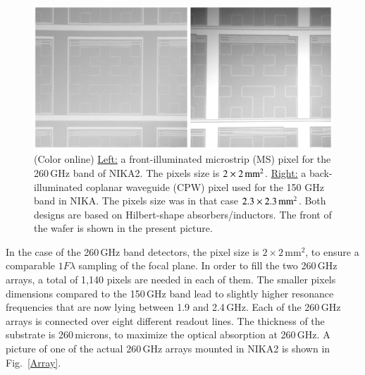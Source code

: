 \documentclass[]{aa} %
\begin{document}
\begin{figure}[h]
   \centering
  	\includegraphics[width=.95\linewidth]{fig3_AB.png}
     \caption{(Color online) \underline{Left:} a front-illuminated microstrip (MS) pixel for the 260\,GHz band of NIKA2. The pixels size is $2\times2\textrm{\,mm}^2$. \underline{Right:} a back-illuminated coplanar waveguide (CPW) pixel used for the 150 GHz band in NIKA. The pixels size was in that case $2.3\times2.3\textrm{\,mm}^2$. Both designs are based on Hilbert-shape absorbers/inductors. The front of the wafer is shown in the present picture.}
         \label{Pixels}
\end{figure}

In the case of the 260\,GHz band detectors, the pixel size is $2\times 2\mathrm{\,mm}^2$, to ensure a comparable $1 F \lambda$ sampling of the focal plane. In order to fill the two 260\,GHz arrays, a total of 1,140 pixels are needed in each of them. The smaller pixels dimensions compared to the 150\,GHz band lead to slightly higher resonance frequencies that are now lying between 1.9 and 2.4\,GHz. Each of the 260\,GHz arrays is connected over eight different readout lines. The thickness of the substrate is 260\,microns, to maximize the optical absorption at 260\,GHz. A picture of one of the actual 260\,GHz arrays mounted in NIKA2 is shown in Fig.~\ref{Array}.
\end{document}
